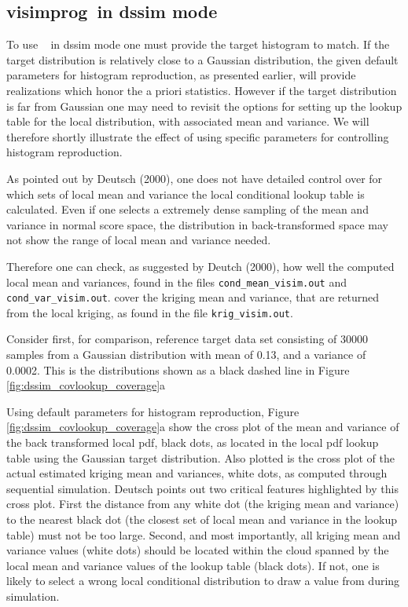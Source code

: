 \documentclass[12t]{article}
\begin{document}
\subsection{visimprog~in dssim mode}
To use \visimprog~ in dssim mode one must provide the target
histogram to match. If the target distribution is relatively close to
a Gaussian distribution, the given default parameters for histogram reproduction, as presented
earlier, will provide realizations which honor the a priori statistics. 
However if the target distribution is far from Gaussian one may need
to revisit the options for setting up the lookup table for the local
distribution, with associated mean and variance. We will therefore shortly illustrate the effect of using specific parameters for controlling histogram reproduction.

As pointed out by Deutsch (2000), one does not have detailed control
over for which sets of local mean and variance the local conditional lookup
table is calculated. Even if one selects a extremely dense sampling of
the mean and variance in normal score space, the distribution in
back-transformed space may not show the range of local mean and variance needed. 

Therefore one can check, as suggested by Deutch (2000), how well the computed local mean and
variances, found in the files \texttt{cond\_mean\_visim.out} and 
\texttt{cond\_var\_visim.out}.
cover the kriging mean and variance, that are returned from the local
kriging, as found in the file \texttt{krig\_visim.out}.

Consider first, for comparison, reference target data set consisting of  30000 samples
from a Gaussian distribution with mean of 0.13, and a variance of
0.0002. This is the distributions shown as a black dashed line in Figure \ref{fig:dssim_covlookup_coverage}a  


Using default parameters for histogram reproduction,
Figure \ref{fig:dssim_covlookup_coverage}a show the cross plot of the mean and variance of the back
transformed local pdf, black dots,
as located in the local pdf lookup table using the Gaussian target distribution. Also plotted is the cross plot of the actual estimated kriging mean and variances, white dots, as
computed through sequential simulation. 
Deutsch points out two critical features highlighted by this cross plot. First the distance from any white dot (the kriging mean and variance) to the nearest black dot (the closest set of local mean and variance in the lookup table) must not be too large. Second, and most importantly, all kriging mean and variance values (white dots) should be located within the cloud spanned by the local mean and variance values of the lookup table (black dots). If not, one is likely to select a wrong local conditional distribution to draw a value from during simulation.
\end{document}
